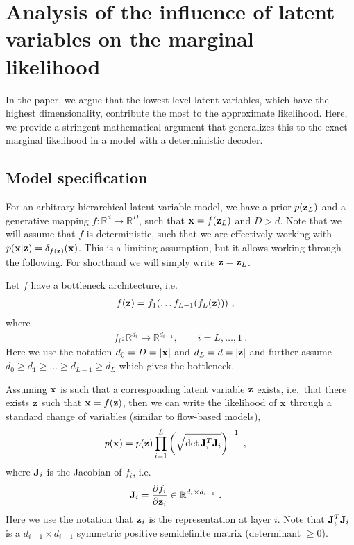 {\section{Analysis of the influence of latent variables on the marginal likelihood} \label{sec_hierarchical:analysis}
In the paper, we argue that the lowest level latent variables, which have the highest dimensionality, contribute the most to the approximate likelihood.
Here, we provide a stringent mathematical argument that generalizes this to the exact marginal likelihood in a model with a deterministic decoder.

\subsection{Model specification}
For an arbitrary hierarchical latent variable model, we have a prior $p({\mathbf{z}}_L)$ and a generative mapping $f: \mathbb{R}^d \rightarrow \mathbb{R}^D$, such that ${\mathbf{x}} = f({\mathbf{z}}_L)$ and $D>d$.
Note that we will assume that $f$ is deterministic, such that we are effectively working with $p({\mathbf{x}}|{\mathbf{z}}) = \delta_{f({\mathbf{z}})}({\mathbf{x}})$.
This is a limiting assumption, but it allows working through the following. For shorthand we will simply write ${\mathbf{z}}={\mathbf{z}}_L$.

Let $f$ have a bottleneck architecture, i.e.\
\begin{align}
f({\mathbf{z}}) &= f_1(\ldots f_{L-1}(f_L({\mathbf{z}}))) \ ,
\end{align}
where
\begin{align}
    f_i: \mathbb{R}^{d_{i}} \rightarrow \mathbb{R}^{d_{i-1}}, \qquad i = L, \ldots, 1 \ .
\end{align}
Here we use the notation $d_0=D=\vert{\mathbf{x}}\vert$ and $d_L=d=\vert{\mathbf{z}}\vert$ and further assume $d_0\geq d_1\geq \ldots \geq d_{L-1} \geq d_L$ which gives the bottleneck.

Assuming ${\mathbf{x}}$ is such that a corresponding latent variable ${\mathbf{z}}$ exists, i.e.\ that there exists ${\mathbf{z}}$ such that ${\mathbf{x}} = f({\mathbf{z}})$, then we can write the likelihood of ${\mathbf{x}}$ through a standard change of variables (similar to flow-based models),
\begin{align}
    p({\mathbf{x}}) &= p({\mathbf{z}}) \prod_{i = 1}^L \left(\sqrt{\det {\mathbf{J}}_i^T {\mathbf{J}}_i}\right)^{-1} \ ,
\end{align}
where ${\mathbf{J}}_i$ is the Jacobian of $f_i$, i.e.
\begin{align}
    {\mathbf{J}}_i &= \frac{\partial f_i}{\partial {\mathbf{z}}_i} \in \mathbb{R}^{d_i\times d_{i-1}} \ .
\end{align}
Here we use the notation that ${\mathbf{z}}_i$ is the representation at layer $i$.
Note that ${\mathbf{J}}_i^T {\mathbf{J}}_i$ is a $d_{i-1} \times d_{i-1}$ symmetric positive semidefinite matrix (determinant $\geq 0$).

}
